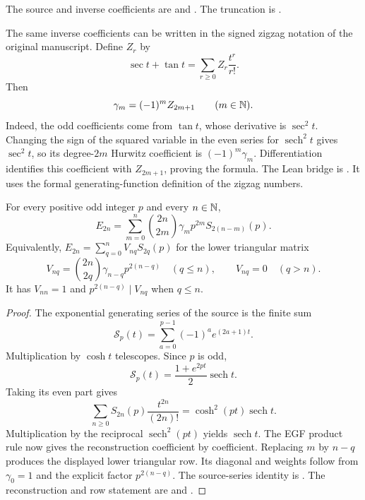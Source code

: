 The source and inverse coefficients are
 and
. The truncation is
.

The same inverse coefficients can be written in the signed zigzag notation
of the original manuscript.  Define $Z_r$ by
\[
 \sec t+\tan t=\sum_{r\ge0}Z_r\frac{t^r}{r!}.
\]
Then
\begin{equation}\label{eq:arith-signed-zigzag}
 \gamma_m=(-1)^m Z_{2m+1}\qquad(m\in\mathbb N).
\end{equation}
Indeed, the odd coefficients come from $\tan t$, whose derivative is
$\sec^2t$.  Changing the sign of the squared variable in the even series
for $\operatorname{sech}^2t$ gives $\sec^2t$, so its degree-$2m$
Hurwitz coefficient is $(-1)^m\gamma_m$.  Differentiation identifies
this coefficient with $Z_{2m+1}$, proving the formula.  The Lean bridge is
. It uses the
formal generating-function definition of the zigzag numbers.

\begin{theorem}
\label{thm:arith-odd-reconstruction}
For every positive odd integer $p$ and every $n\in\mathbb N$,
\[
 E_{2n}=\sum_{m=0}^{n}\binom{2n}{2m}\gamma_m p^{2m}S_{2(n-m)}(p).
\]
Equivalently, $E_{2n}=\sum_{q=0}^n V_{nq}S_{2q}(p)$ for the lower
triangular matrix
\[
 V_{nq}=\binom{2n}{2q}\gamma_{n-q}p^{2(n-q)}\quad(q\le n),
 \qquad V_{nq}=0\quad(q>n).
\]
It has $V_{nn}=1$ and $p^{2(n-q)}\mid V_{nq}$ when $q\le n$.
\end{theorem}

\begin{proof}
The exponential generating series of the source is the finite sum
\[
 \mathcal S_p(t)=\sum_{a=0}^{p-1}(-1)^a e^{(2a+1)t}.
\]
Multiplication by $\cosh t$ telescopes.  Since $p$ is odd,
\[
 \mathcal S_p(t)=\frac{1+e^{2pt}}{2}\operatorname{sech}t.
\]
Taking its even part gives
\[
 \sum_{n\ge0}S_{2n}(p)\frac{t^{2n}}{(2n)!}
       =\cosh^2(pt)\operatorname{sech}t.
\]
Multiplication by the reciprocal $\operatorname{sech}^2(pt)$
yields $\operatorname{sech}t$.  The EGF product rule now gives the
reconstruction coefficient by coefficient.  Replacing $m$ by $n-q$
produces the displayed lower triangular row.  Its diagonal and weights
follow from $\gamma_0=1$ and the explicit factor $p^{2(n-q)}$.
The source-series identity is
. The reconstruction
and row statement are
 and
.
\end{proof}


